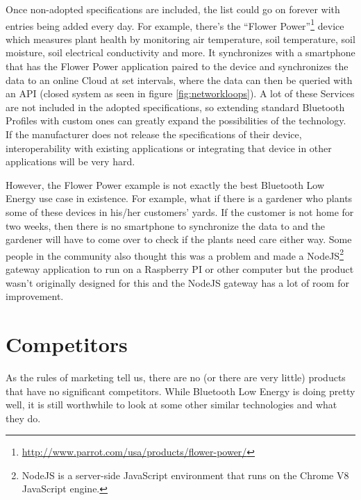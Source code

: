 \documentclass[pdftex,a4paper,12pt,twoside]{report}
\begin{document}
Once non-adopted specifications are included, the list could go on forever with entries being added every day. For example, there's the ``Flower Power''\footnote{\url{http://www.parrot.com/usa/products/flower-power/}} device which measures plant health by monitoring air temperature, soil temperature, soil moisture, soil electrical conductivity and more. It synchronizes with a smartphone that has the Flower Power application paired to the device and synchronizes the data to an online Cloud at set intervals, where the data can then be queried with an API (closed system as seen in figure \ref{fig:networkloops}). A lot of these Services are not included in the adopted specifications, so extending standard Bluetooth Profiles with custom ones can greatly expand the possibilities of the technology. If the manufacturer does not release the specifications of their device, interoperability with existing applications or integrating that device in other applications will be very hard.

However, the Flower Power example is not exactly the best Bluetooth Low Energy use case in existence. For example, what if there is a gardener who plants some of these devices in his/her customers' yards. If the customer is not home for two weeks, then there is no smartphone to synchronize the data to and the gardener will have to come over to check if the plants need care either way. Some people in the community also thought this was a problem and made a NodeJS\footnote{NodeJS is a server-side JavaScript environment that runs on the Chrome V8 JavaScript engine.} gateway application to run on a Raspberry PI or other computer but the product wasn't originally designed for this and the NodeJS gateway has a lot of room for improvement.

\section{Competitors}
\label{sec:competitors}
As the rules of marketing tell us, there are no (or there are very little) products that have no significant competitors. While Bluetooth Low Energy is doing pretty well, it is still worthwhile to look at some other similar technologies and what they do.
\end{document}
